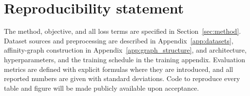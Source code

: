 \section*{Reproducibility statement}

The method, objective, and all loss terms are specified in
Section~\ref{sec:method}. Dataset sources and preprocessing are described in
Appendix~\ref{app:datasets}, affinity-graph construction in
Appendix~\ref{app:graph_structure}, and architecture, hyperparameters, and the
training schedule in the training appendix. Evaluation metrics are defined with
explicit formulas where they are introduced, and all reported numbers are given
with standard deviations. Code to reproduce every table and figure will be
made publicly available upon acceptance.
